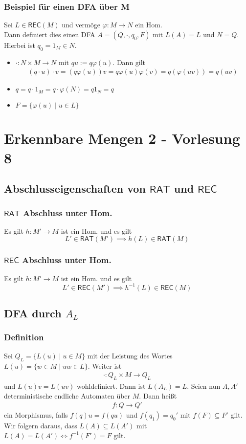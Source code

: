 \documentclass[12pt, german]{article}
\newcommand{\inv}{^{-1}}
\newcommand{\rat}{\mathsf{RAT}}
\newcommand{\rec}{\mathsf{REC}}
\begin{document}
	\subsubsection{Beispiel für einen DFA über M}
	Sei $L \in \rec(M)$ und vermöge $\varphi: M \to N$ ein Hom. \\ 
	Dann definiert dies einen DFA $A = (Q,\cdot, q_0, F)$ mit $L(A) = L$ und $N = Q$. 
	Hierbei ist $q_0 = 1_M \in N$. 
	\begin{itemize}
		\item $\cdot : N \times M \to N$ mit $qu := q\varphi(u)$. Dann gilt
		\begin{align*}
			(q \cdot u)\cdot v = (q\varphi(u))v = q \varphi(u)\varphi(v) = q(\varphi(uv)) = q(uv)
		\end{align*}
		\item $q = q \cdot 1_M = q \cdot \varphi(N) = q1_N = q$
		\item $F = \{\varphi(u) \mid u \in L \}$
	\end{itemize}
	
	\section{Erkennbare Mengen 2 - Vorlesung 8}
	\subsection{Abschlusseigenschaften von $\rat$ und $\rec$}
	\subsubsection{$\rat$ Abschluss unter Hom.}
	Es gilt $h: M' \to M$ ist ein Hom. und es gilt $$L' \in \rat(M') \implies h(L) \in \rat(M)$$
	
	\subsubsection{$\rec$ Abschluss unter Hom.}
	Es gilt $h: M' \to M$ ist ein Hom. und es gilt $$L' \in \rec(M') \implies h\inv(L) \in \rec(M)$$
	
	\subsection{DFA durch $A_L$}
	\subsubsection{Definition}
	Sei $Q_L = \{L(u) \mid u \in M\}$ mit der Leistung des Wortes $L(u) = \{ w \in M \mid uw \in L\}$. Weiter ist 
	\begin{align*}
		\cdot: Q_L \times M  \to Q_L
	\end{align*}
	und $L(u)v = L(uv)$ wohldefiniert. Dann ist $L(A_L) = L$. 
	Seien nun $A, A'$ deterministische endliche Automaten über $M$. Dann heißt 
	\begin{align*}
		f: Q \to Q'
	\end{align*} ein Morphismus, falls $f(q)u=f(qu)$ und $f(q_1) = q_0'$ mit $f(F) \subseteq F'$ gilt.
	Wir folgern daraus, dass $L(A) \subseteq L(A')$ mit $L(A) = L(A') \iff f\inv(F') = F$ gilt. 
	
\end{document}
